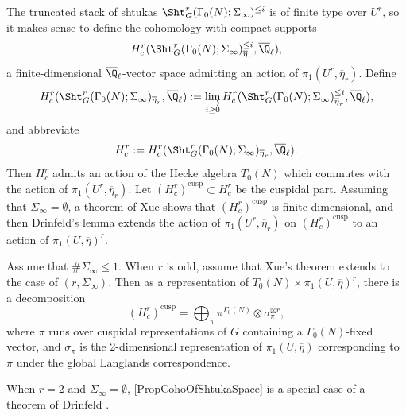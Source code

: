 \documentclass{article}
\begin{document}
The truncated stack of shtukas $\Sht_G^r(\Gamma_0(N);\Sigma_\infty)^{\leq i}$ is of finite type over $U^r$, so it makes sense to define the cohomology with compact supports 
\[H^r_c(\Sht_G^r(\Gamma_0(N);\Sigma_\infty)^{\leq i}_{\overline{\eta}_r},\overline{\Q}_\ell),\]
a finite-dimensional $\overline{\Q}_\ell$-vector space admitting an action of $\pi_1(U^r,\overline{\eta}_r)$.  Define
\[ H^r_c(\Sht_G^r(\Gamma_0(N);\Sigma_\infty)_{\overline{\eta}_r},\overline{\Q}_\ell):=\varinjlim_{i\geq 0} H^r_c(\Sht_G^r(\Gamma_0(N);\Sigma_\infty)^{\leq i}_{\overline{\eta}_r},\overline{\Q}_\ell),\]
and abbreviate
\[ H^r_c:=H^r_c(\Sht_G^r(\Gamma_0(N);\Sigma_\infty)_{\overline{\eta}_r},\overline{\Q}_\ell). \]
Then $H^r_c$ admits an action of the Hecke algebra $T_0(N)$ which commutes with the action of $\pi_1(U^r,\overline{\eta}_r)$.  Let $(H^r_c)^{\text{cusp}}\subset H^r_c$ be the cuspidal part.  Assuming that $\Sigma_\infty=\emptyset$, a theorem of Xue  \cite[Theorem 5.0.1]{Xue} shows that $(H^r_c)^{\text{cusp}}$ is finite-dimensional, and then Drinfeld's lemma extends the action of $\pi_1(U^r,\overline{\eta}_r)$ on $(H^r_c)^{\text{cusp}}$ to an action of $\pi_1(U,\overline{\eta})^r$.

\begin{prop}  
\label{PropCohoOfShtukaSpace} Assume that $\#\Sigma_\infty\leq 1$.  When $r$ is odd,  assume that Xue's theorem \cite[Theorem 5.0.1]{Xue} extends to the case of $(r,\Sigma_\infty)$.  Then as a representation of $T_0(N)\times \pi_1(U,\overline{\eta})^r$, there is a decomposition
\[ (H^r_c)^{\mathrm{cusp}} = \bigoplus_\pi \pi^{\Gamma_0(N)} \otimes \sigma^{\boxtimes r}_\pi, \]
where $\pi$ runs over cuspidal representations of $G$ containing a $\Gamma_0(N)$-fixed vector, and $\sigma_\pi$ is the 2-dimensional representation of $\pi_1(U,\overline{\eta})$ corresponding to $\pi$ under the global Langlands correspondence.
\end{prop}


\begin{rmk} When $r=2$ and $\Sigma_\infty=\emptyset$, \eqref{PropCohoOfShtukaSpace} is a special case of a theorem of Drinfeld \cite{DrinfeldLanglandsConjectureForGL2}. 
\end{rmk}
\end{document}
